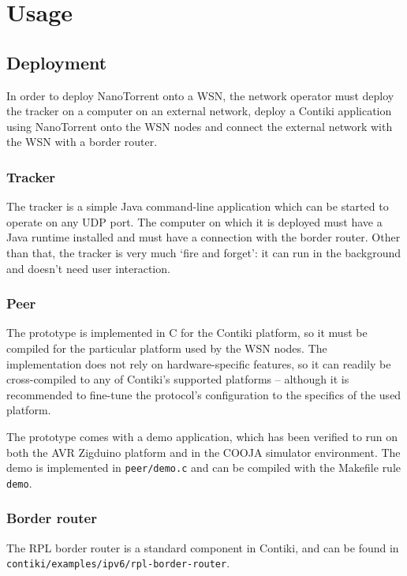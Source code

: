 \section{Usage}
\label{sec:impl:usage}

\subsection{Deployment}
In order to deploy NanoTorrent onto a \gls{WSN}, the network operator must deploy the tracker on a computer on an external network, deploy a Contiki application using NanoTorrent onto the \gls{WSN} nodes and connect the external network with the \gls{WSN} with a border router.

\subsubsection{Tracker}
The tracker is a simple Java command-line application which can be started to operate on any \gls{UDP} port. The computer on which it is deployed must have a Java runtime installed and must have a connection with the border router. Other than that, the tracker is very much `fire and forget': it can run in the background and doesn't need user interaction.

\subsubsection{Peer}
The prototype is implemented in C for the Contiki platform, so it must be compiled for the particular platform used by the \gls{WSN} nodes. The implementation does not rely on hardware-specific features, so it can readily be cross-compiled to any of Contiki's supported platforms -- although it is recommended to fine-tune the protocol's configuration to the specifics of the used platform.

The prototype comes with a demo application, which has been verified to run on both the AVR Zigduino platform and in the COOJA simulator environment. The demo is implemented in \texttt{peer/demo.c} and can be compiled with the Makefile rule \texttt{demo}.

\subsubsection{Border router}
The \gls{RPL} border router is a standard component in Contiki, and can be found in \texttt{contiki/examples/ipv6/rpl-border-router}.

